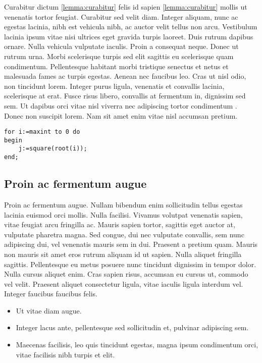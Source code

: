 \documentclass[a4paper,UKenglish,cleveref, autoref, thm-restate]{lipics-v2021}
\begin{document}
Curabitur dictum \cref{lemma:curabitur} felis id sapien \autoref{lemma:curabitur} mollis ut venenatis tortor feugiat. Curabitur sed velit diam. Integer aliquam, nunc ac egestas lacinia, nibh est vehicula nibh, ac auctor velit tellus non arcu. Vestibulum lacinia ipsum vitae nisi ultrices eget gravida turpis laoreet. Duis rutrum dapibus ornare. Nulla vehicula vulputate iaculis. Proin a consequat neque. Donec ut rutrum urna. Morbi scelerisque turpis sed elit sagittis eu scelerisque quam condimentum. Pellentesque habitant morbi tristique senectus et netus et malesuada fames ac turpis egestas. Aenean nec faucibus leo. Cras ut nisl odio, non tincidunt lorem. Integer purus ligula, venenatis et convallis lacinia, scelerisque at erat. Fusce risus libero, convallis at fermentum in, dignissim sed sem. Ut dapibus orci vitae nisl viverra nec adipiscing tortor condimentum \cite{DBLP:journals/cacm/Dijkstra68a}. Donec non suscipit lorem. Nam sit amet enim vitae nisl accumsan pretium. 

\begin{lstlisting}[caption={Useless code.},label=list:8-6,captionpos=t,float,abovecaptionskip=-\medskipamount]
for i:=maxint to 0 do 
begin 
    j:=square(root(i));
end;
\end{lstlisting}

\subsection{Proin ac fermentum augue}

Proin ac fermentum augue. Nullam bibendum enim sollicitudin tellus egestas lacinia euismod orci mollis. Nulla facilisi. Vivamus volutpat venenatis sapien, vitae feugiat arcu fringilla ac. Mauris sapien tortor, sagittis eget auctor at, vulputate pharetra magna. Sed congue, dui nec vulputate convallis, sem nunc adipiscing dui, vel venenatis mauris sem in dui. Praesent a pretium quam. Mauris non mauris sit amet eros rutrum aliquam id ut sapien. Nulla aliquet fringilla sagittis. Pellentesque eu metus posuere nunc tincidunt dignissim in tempor dolor. Nulla cursus aliquet enim. Cras sapien risus, accumsan eu cursus ut, commodo vel velit. Praesent aliquet consectetur ligula, vitae iaculis ligula interdum vel. Integer faucibus faucibus felis. 

\begin{itemize}
\item Ut vitae diam augue. 
\item Integer lacus ante, pellentesque sed sollicitudin et, pulvinar adipiscing sem. 
\item Maecenas facilisis, leo quis tincidunt egestas, magna ipsum condimentum orci, vitae facilisis nibh turpis et elit. 
\end{itemize}
\end{document}
